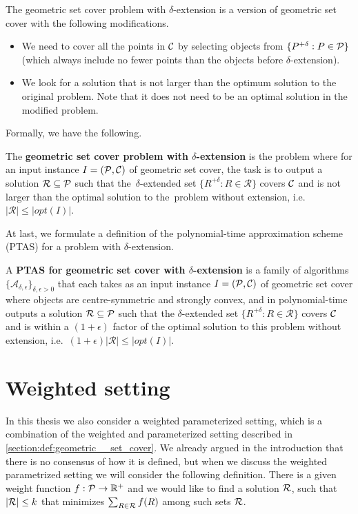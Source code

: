 The geometric set cover problem with $\delta$-extension
is a version of geometric set cover with
the following modifications.
\begin{itemize}
\item We need to cover all the points in $\mathcal{C}$
by selecting objects from $\{P^{+\delta} : P \in \mathcal{P}\}$ (which always 
include no fewer points than the objects
before $\delta$-extension).
\item We look for a solution that is not larger than the optimum
solution to the original problem.
Note that it does not need to be an optimal solution in
the modified problem.
\end{itemize}
Formally, we have the following.

\begin{defi}
The \textbf{geometric set cover problem
with $\delta$-extension} is the problem where for an input instance
$I=(\mathcal{P}, \mathcal{C})$ of geometric set cover,
the task is to output a solution $\mathcal{R} \subseteq \mathcal{P}$
such that the~$\delta$-extended set
$\{ R^{+\delta} :  R \in \mathcal{R} \}$ covers $\mathcal{C}$
and is not larger than the optimal solution to the~problem without
extension, i.e.~$|\mathcal{R}| \le |opt(I)|$.
\end{defi}

At last, we formulate a definition of the
polynomial-time approximation scheme (PTAS)
for a problem with $\delta$-extension.

\begin{defi}
A \textbf{PTAS for geometric set cover 
with $\delta$-extension} is a family of algorithms
$\{\mathcal{A}_{\delta, \epsilon}\}_{\delta, \epsilon > 0}$ that
each takes as an input instance $I=(\mathcal{P}, \mathcal{C})$
of geometric set cover where objects are centre-symmetric and strongly convex,
and in polynomial-time outputs a solution $\mathcal{R} \subseteq \mathcal{P}$
such that the $\delta$-extended set
$\{ R^{+\delta} :  R \in \mathcal{R} \}$ covers $\mathcal{C}$
and is within a $(1+\epsilon)$ factor of the optimal
solution to this problem without
extension, i.e.~$(1+\epsilon)|\mathcal{R}| \le |opt(I)|$.
\end{defi}

\section{Weighted setting}

In this thesis we also consider a weighted parameterized setting,
which is a combination
of the weighted and parameterized setting described in 
\ref{section:def:geometric__set_cover}.
We already argued in the introduction
that there is no consensus of how it is defined, but when we discuss the
weighted parametrized setting we will consider the following
definition. There is a given weight function
$f : \mathcal{P} \rightarrow \mathbb{R^+}$
and we would like to find a solution $\mathcal{R}$,
such that $|\mathcal{R}| \le k$
that minimizes $\sum_{R \in \mathcal{R}} f(R)$ among such sets $\mathcal{R}$.

